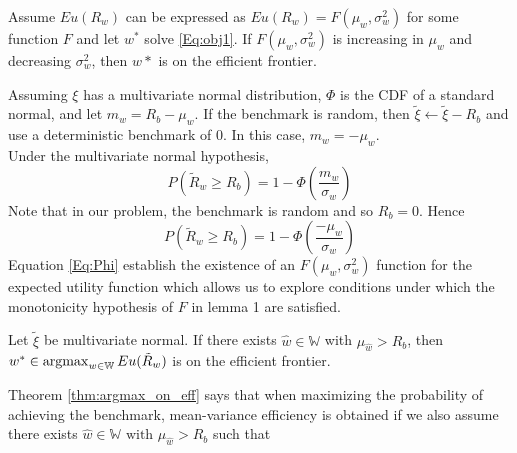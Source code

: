 				\begin{lem}\label{lem:mean-eff}\cite{morton2003optimizing}
					Assume $Eu(R_w)$ can be expressed as $Eu(R_w) = F(\mu_w,\sigma_w^2)$ for some function $F$ and let $w^*$ solve \eqref{Eq:obj1}. If $ F(\mu_w,\sigma_w^2)$ is increasing in $\mu_w$ and decreasing $\sigma_w^2$, then $w*$ is on the efficient frontier.
				\end{lem}
				Assuming $\xi$ has a multivariate normal distribution, $\Phi$ is the CDF of a standard normal, and let $m_w = R_b-\mu_w$. If the benchmark is random, then $\tilde{\xi}  \leftarrow \tilde{\xi}-R_b$ and use a deterministic benchmark of 0. In this case, $m_w = -\mu_w$.\\
				Under the multivariate normal hypothesis,
				\begin{equation}\label{Eq:Phi}
					P(\tilde{R}_w \ge R_b) = 1 - \Phi(\frac{m_w}{\sigma_w})
				\end{equation}
				Note that in our problem, the benchmark is random and so $R_b = 0$. Hence
				\begin{equation}\label{Eq:Phi}
					P(\tilde{R}_w \ge R_b) = 1 - \Phi(\frac{-\mu_w}{\sigma_w})
				\end{equation}
				Equation \eqref{Eq:Phi} establish the existence of an $F(\mu_w,\sigma_w^2)$ function for the expected utility function which allows us to explore conditions under which the monotonicity hypothesis of $F$ in lemma 1 are satisfied.

				\begin{thm}\label{thm:argmax_on_eff}\cite{morton2003optimizing}
					Let $\tilde{\xi}$ be multivariate normal. If there exists $\hat{w} \in \mathbb{W}$ with $\mu_{\hat{w}} > R_b$, then $w^* \in  \operatorname*{argmax}_{w \in \mathbb{W}} Eu(\tilde{R}_w)$ is on the efficient frontier.\\
				\end{thm}

				Theorem \ref{thm:argmax_on_eff} says that when maximizing the probability of achieving the benchmark, mean-variance efficiency is obtained if we also assume there exists $\hat{w} \in \mathbb{W} \text{ with } \mu_{\hat{w}} > R_b$ such that


